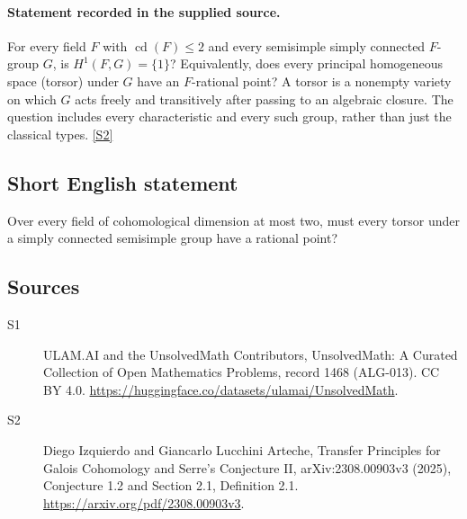 \documentclass[11pt]{article}
\newcommand{\sref}[2]{\hyperlink{source:#1:#2}{[S#2]}}
\begin{document}
\paragraph{Statement recorded in the supplied source.}
For every field $F$ with $\operatorname{cd}(F)\le2$ and every semisimple simply connected $F$-group $G$, is $H^1(F,G)=\{1\}$? Equivalently, does every principal homogeneous space (torsor) under $G$ have an $F$-rational point? A torsor is a nonempty variety on which $G$ acts freely and transitively after passing to an algebraic closure. The question includes every characteristic and every such group, rather than just the classical types. \sref{1468}{2}
\subsection{Short English statement}
Over every field of cohomological dimension at most two, must every torsor under a simply connected semisimple group have a rational point?
\subsection{Sources}
\begin{description}
\item[\hypertarget{source:1468:1}{S1}] ULAM.AI and the UnsolvedMath Contributors, UnsolvedMath: A Curated Collection of Open Mathematics Problems, record 1468 (ALG-013). CC BY 4.0. \url{https://huggingface.co/datasets/ulamai/UnsolvedMath}.
\item[\hypertarget{source:1468:2}{S2}] Diego Izquierdo and Giancarlo Lucchini Arteche, Transfer Principles for Galois Cohomology and Serre’s Conjecture II, arXiv:2308.00903v3 (2025), Conjecture 1.2 and Section 2.1, Definition 2.1. \url{https://arxiv.org/pdf/2308.00903v3}.
\end{description}
\label{end:1468}
\end{document}
